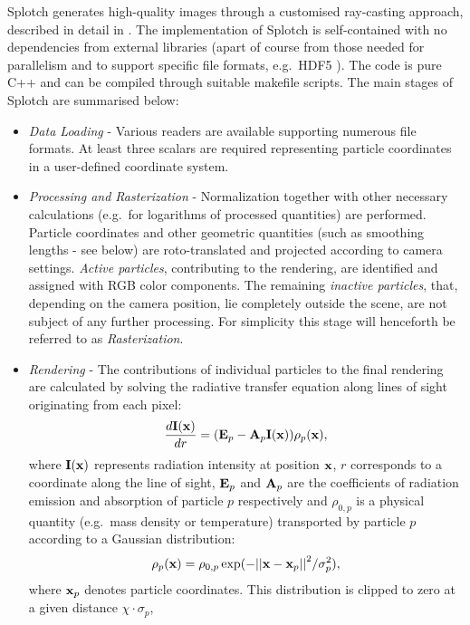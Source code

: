 \documentclass[smallextended]{svjour3}
\begin{document}
Splotch generates high-quality images through a customised ray-casting approach, described in detail in \cite{2008NJPh...10l5006D}.  
The implementation of Splotch is self-contained with no dependencies from external libraries (apart of course from those needed for parallelism and to support specific file formats, e.g.\ HDF5 \cite{hdf5}). The code is pure C++ and can be compiled through suitable makefile scripts.
The main stages of Splotch are summarised below:
\begin{itemize}
\item
{\it Data Loading} - Various readers are available supporting numerous file formats. At least three scalars are required representing particle coordinates in a user-defined coordinate system.
\item
{\it Processing and Rasterization} - Normalization together with other necessary 
calculations (e.g.\ for logarithms of processed quantities) are performed. Particle
coordinates and other geometric quantities (such as smoothing lengths - see below) are
roto-translated and projected according to camera settings.
{\it Active particles},  contributing to the rendering, are identified and assigned with RGB color components. The remaining
{\it inactive particles}, that, depending on the camera position, lie completely outside the scene, are not subject of any further processing.
For simplicity this stage will henceforth be referred to as {\it Rasterization}.
\item
{\it Rendering} - The contributions of individual particles to the final rendering are calculated by solving the radiative transfer equation  \cite{1991par..book.....S} along lines of sight originating from each pixel:
\begin{equation}\label{rad}
\frac{d{\bf I}{(\bf x})}{dr}=({\bf E}_p-{\bf A}_p{\bf I}({\bf x}))\rho_p({\bf x}),
\end{equation}
where ${\bf I}({\bf x})$ represents radiation intensity at position ${\bf x}$, $r$ corresponds to a coordinate along the line of sight,  ${\bf E}_p$ and ${\bf A}_p$ are the coefficients of radiation emission and absorption of particle $p$ respectively and $\rho_{0,p}$ is a physical quantity (e.g.\ mass density or temperature) transported by particle $p$ according to a Gaussian distribution:
\begin{equation}\label{kernel}
\rho_p({\bf x}) = \rho_{0,p}\exp(-{||{\bf x}-{\bf x}_p||}^2/\sigma_p^2),
\end{equation}
where ${\bf x}_p$ denotes particle coordinates. This distribution is clipped to zero at a given distance $\chi\cdot\sigma_p$, 

\end{itemize}
\end{document}
